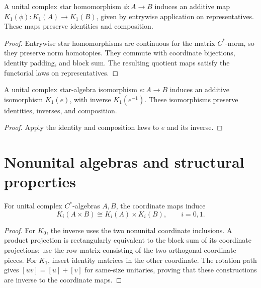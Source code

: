 \begin{proposition}\label{prop:unital-k1-functoriality}
A unital complex star homomorphism $\phi:A\to B$ induces an additive map
$K_1(\phi):K_1(A)\to K_1(B)$, given by entrywise application on representatives.
These maps preserve identities and composition.
\end{proposition}
\begin{proof}
\leanok
Entrywise star homomorphisms are continuous for the matrix $C^*$-norm,
so they preserve norm homotopies. They commute with coordinate bijections,
identity padding, and block sum. The resulting quotient maps satisfy the
functorial laws on representatives.
\end{proof}

\begin{proposition}\label{prop:unital-k1-isomorphism}
A unital complex star-algebra isomorphism $e:A\to B$ induces an additive
isomorphism $K_1(e)$, with inverse $K_1(e^{-1})$. These isomorphisms preserve
identities, inverses, and composition.
\end{proposition}
\begin{proof}
\leanok
Apply the identity and composition laws to $e$ and its inverse.
\end{proof}

\section{Nonunital algebras and structural properties}

\begin{proposition}\label{prop:k-product-decomposition}
For unital complex $C^*$-algebras $A,B$, the coordinate maps induce
\[
 K_i(A\times B)\cong K_i(A)\times K_i(B),\qquad i=0,1.
\]
\end{proposition}
\begin{proof}
\leanok
For $K_0$, the inverse uses the two nonunital coordinate inclusions.
A product projection is rectangularly equivalent to the block sum of its
coordinate projections: use the row matrix consisting of the two orthogonal
coordinate pieces. For $K_1$, insert identity matrices in the other coordinate.
The rotation path gives $[uv]=[u]+[v]$ for same-size unitaries, proving that
these constructions are inverse to the coordinate maps.
\end{proof}

